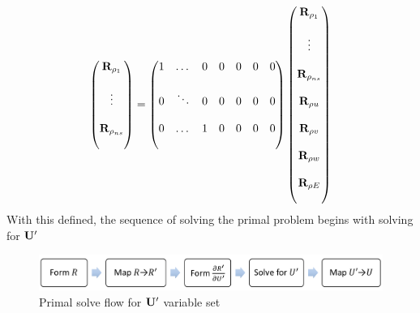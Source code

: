\documentclass{article}   	%
\begin{document}
\begin{equation}
  \begin{pmatrix}
    \mathbf R_{\rho_1}     \\ \\
    \vdots           \\ \\
    \mathbf R_{\rho_{ns}}  \\ \\
  \end{pmatrix} =
  \begin{pmatrix}
    1  &  \dots  &  0  &  0  &  0  &  0  &  0  \\ \\
    0  &  \ddots &  0  &  0  &  0  &  0  &  0  \\ \\
    0  &  \dots  &  1  &  0  &  0  &  0  &  0  \\ \\
  \end{pmatrix}
  \begin{pmatrix}
    \mathbf R_{\rho_1}    \\ \\
         \vdots     \\ \\
    \mathbf R_{\rho_{ns}} \\ \\
    \mathbf R_{\rho u}    \\ \\
		\mathbf R_{\rho v}    \\ \\
		\mathbf R_{\rho w}    \\ \\
		\mathbf R_{\rho E}    \\ \\
  \end{pmatrix}
  \label{R-map2}
\end{equation}
With this defined, the sequence of solving the primal problem begins with
solving for $\mathbf{U}'$
\begin{figure}[h]
  \centering
  \includegraphics[width=\textwidth]{mean_solve_flow.png}
  \caption{Primal solve flow for $\mathbf{U}'$ variable set}
  \label{fig:mean-solve-flow}
\end{figure}
\end{document}
